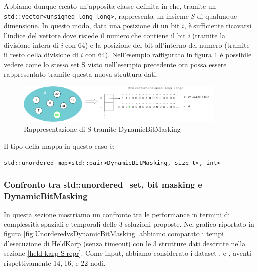 \noindent Abbiamo dunque creato un'apposita classe definita in  che,  tramite un \texttt{std::vector<unsigned long long>}, rappresenta un insieme $S$ di qualunque dimensione. In questo modo, data una posizione di un bit $i$, è sufficiente ricavarsi l'indice del vettore dove risiede il numero che contiene il bit $i$ (tramite la divisione intera di $i$ con 64) e la posizione del bit all'interno del numero (tramite il resto della divisione di $i$ con 64). Nell'esempio raffigurato in figura \ref{fig:DynamicBitMasking-example} è possibile vedere come lo stesso set S visto nell'esempio precedente ora possa essere rappresentato tramite questa nuova struttura dati. \\

\begin{figure}[h]
	\centering
	\includegraphics[width=0.9\textwidth]{./images/BitMaskingExtended Example.png}
	\caption{Rappresentazione di S tramite DynamicBitMasking}
	\label{fig:DynamicBitMasking-example}
\end{figure}

\noindent Il tipo della mappa in questo caso è:

\begin{center}
    \texttt{std::unordered_map<std::pair<DynamicBitMasking, size_t>, int>}
\end{center}

\subsubsection{Confronto tra std::unordered\_set, bit masking e DynamicBitMasking}

In questa sezione mostriamo un confronto tra le performance in termini di complessità spaziali e temporali delle 3 soluzioni proposte. Nel grafico riportato in figura \ref{fig:UnorderedvsDynamicBitMasking} abbiamo comparato i tempi d'esecuzione di HeldKarp (senza timeout) con le 3 strutture dati descritte nella sezione \ref{held-karp-S-repr}.
Come input, abbiamo considerato i dataset ,  e , aventi rispettivamente 14, 16, e 22 nodi.

